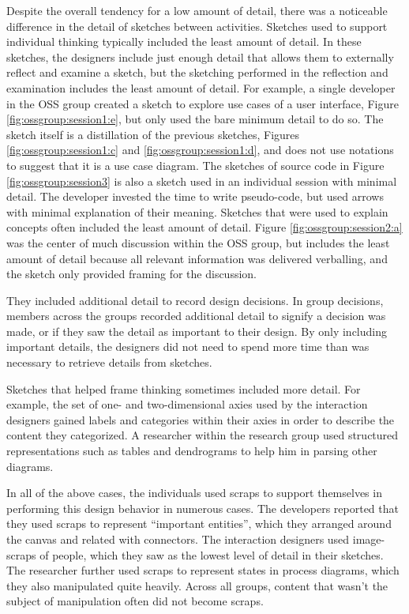 Despite the overall tendency for a low amount of detail, there was a noticeable difference in the detail of sketches between activities. Sketches used to support individual thinking typically included the least amount of detail. In these sketches, the designers include just enough detail that allows them to externally reflect and examine a sketch, but the sketching performed in the reflection and examination includes the least amount of detail. For example, a single developer in the OSS group created a sketch to explore use cases of a user interface, Figure \ref{fig:ossgroup:session1:e}, but only used the bare minimum detail to do so. The sketch itself is a distillation of the previous sketches, Figures \ref{fig:ossgroup:session1:c} and \ref{fig:ossgroup:session1:d}, and does not use notations to suggest that it is a use case diagram. The sketches of source code in Figure \ref{fig:ossgroup:session3} is also a sketch used in an individual session with minimal detail. The developer invested the time to write pseudo-code, but used arrows with minimal explanation of their meaning. Sketches that were used to explain concepts often included the least amount of detail. Figure \ref{fig:ossgroup:session2:a} was the center of much discussion within the OSS group, but includes the least amount of detail because all relevant information was delivered verballing, and the sketch only provided framing for the discussion.

They included additional detail to record design decisions. In group decisions, members across the groups recorded additional detail to signify a decision was made, or if they saw the detail as important to their design. By only including important details, the designers did not need to spend more time than was necessary to retrieve details from sketches. 

Sketches that helped frame thinking sometimes included more detail. For example, the set of one- and two-dimensional axies used by the interaction designers gained labels and categories within their axies in order to describe the content they categorized. A researcher within the research group used structured representations such as tables and dendrograms to help him in parsing other diagrams.

In all of the above cases, the individuals used scraps to support themselves in performing this design behavior in numerous cases. The developers reported that they used scraps to represent ``important entities'', which they arranged around the canvas and related with connectors. The interaction designers used image-scraps of people, which they saw as the lowest level of detail in their sketches. The researcher further used scraps to represent states in process diagrams, which they also manipulated quite heavily. Across all groups, content that wasn't the subject of manipulation often did not become scraps.

